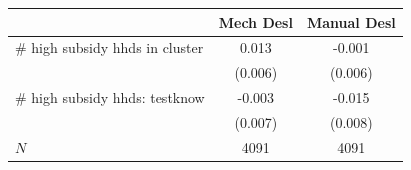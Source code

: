 \begin{tabular}{lcc}
\hline\hline
 & Mech Desl & Manual Desl \\
\hline
# high subsidy hhds in cluster & 0.013 & -0.001 \\
 & (0.006) & (0.006) \\
# high subsidy hhds: testknow & -0.003 & -0.015 \\
 & (0.007) & (0.008) \\
\hline
$N$ & 4091 & 4091 \\
\hline\hline
\end{tabular}
